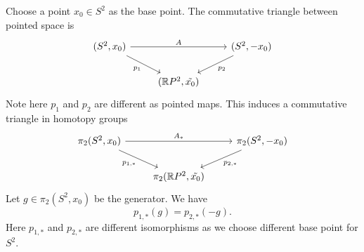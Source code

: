 \documentclass[letterpaper, 12pt]{article}
\begin{document}
\begin{solution}
Choose a point \(x_0\in S^2\) as the base point. The commutative triangle between pointed space is 
\[\begin{tikzcd}
	{(S^2,x_0)} && {(S^2,-x_0)} \\
	& {(\mathbb{R}P^2,\tilde{x_0})}
	\arrow["A", from=1-1, to=1-3]
	\arrow["{p_1}"', from=1-1, to=2-2]
	\arrow["{p_2}", from=1-3, to=2-2]
\end{tikzcd}\]
Note here \(p_1\) and \(p_2\) are different as pointed maps. This induces a commutative triangle in homotopy groups 
\[\begin{tikzcd}
	{\pi_2(S^2,x_0)} && {\pi_2(S^2,-x_0)} \\
	& {\pi_2(\mathbb{R}P^2,\tilde{x_0})}
	\arrow["{A_*}", from=1-1, to=1-3]
	\arrow["{p_{1,*}}"', from=1-1, to=2-2]
	\arrow["{p_{2,*}}", from=1-3, to=2-2]
\end{tikzcd}\]
Let \(g\in \pi_2(S^2,x_0)\) be the generator. We have 
\[p_{1,*}(g)=p_{2,*}(-g).\]
Here \(p_{1,*}\) and \(p_{2,*}\) are different isomorphisms as we choose different base point for \(S^2\). 
\end{solution}
\end{document}
